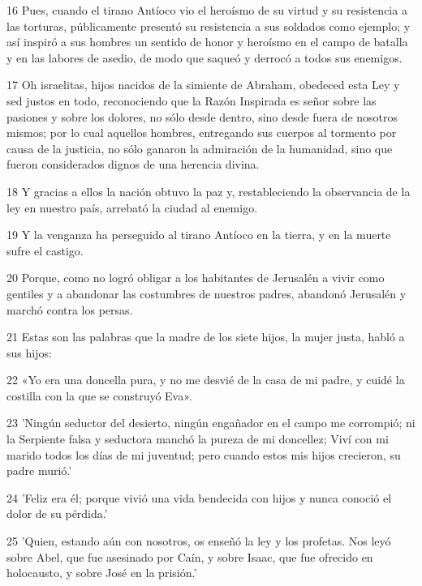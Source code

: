 \par 16 Pues, cuando el tirano Antíoco vio el heroísmo de su virtud y su resistencia a las torturas, públicamente presentó su resistencia a sus soldados como ejemplo; y así inspiró a sus hombres un sentido de honor y heroísmo en el campo de batalla y en las labores de asedio, de modo que saqueó y derrocó a todos sus enemigos.

\par 17 Oh israelitas, hijos nacidos de la simiente de Abraham, obedeced esta Ley y sed justos en todo, reconociendo que la Razón Inspirada es señor sobre las pasiones y sobre los dolores, no sólo desde dentro, sino desde fuera de nosotros mismos; por lo cual aquellos hombres, entregando sus cuerpos al tormento por causa de la justicia, no sólo ganaron la admiración de la humanidad, sino que fueron considerados dignos de una herencia divina.

\par 18 Y gracias a ellos la nación obtuvo la paz y, restableciendo la observancia de la ley en nuestro país, arrebató la ciudad al enemigo.

\par 19 Y la venganza ha perseguido al tirano Antíoco en la tierra, y en la muerte sufre el castigo.

\par 20 Porque, como no logró obligar a los habitantes de Jerusalén a vivir como gentiles y a abandonar las costumbres de nuestros padres, abandonó Jerusalén y marchó contra los persas.

\par 21 Estas son las palabras que la madre de los siete hijos, la mujer justa, habló a sus hijos:

\par 22 «Yo era una doncella pura, y no me desvié de la casa de mi padre, y cuidé la costilla con la que se construyó Eva».

\par 23 'Ningún seductor del desierto, ningún engañador en el campo me corrompió; ni la Serpiente falsa y seductora manchó la pureza de mi doncellez; Viví con mi marido todos los días de mi juventud; pero cuando estos mis hijos crecieron, su padre murió.'

\par 24 'Feliz era él; porque vivió una vida bendecida con hijos y nunca conoció el dolor de su pérdida.'

\par 25 'Quien, estando aún con nosotros, os enseñó la ley y los profetas. Nos leyó sobre Abel, que fue asesinado por Caín, y sobre Isaac, que fue ofrecido en holocausto, y sobre José en la prisión.'


